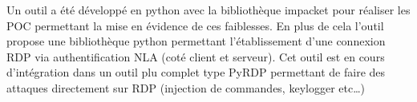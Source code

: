 Un outil a \'eté développé en python avec la bibliothèque impacket pour réaliser les POC permettant la mise en évidence de ces faiblesses.
En plus de cela l’outil propose une bibliothèque python permettant l’\'etablissement d’une connexion RDP via authentification NLA (coté client et serveur). Cet outil est en cours d’intégration dans un outil plu complet type PyRDP permettant de faire des attaques directement sur RDP (injection de commandes, keylogger etc…)



